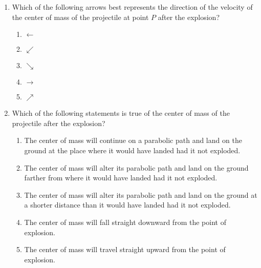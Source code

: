 \documentclass{../../oss-apphys}
\begin{document}
\begin{multicols}{2}
  \begin{enumerate}[leftmargin=18pt,resume]
  \item Which of the following arrows best represents the direction of the
    velocity of the center of mass of the projectile at point $P$ after the
    explosion?
    \begin{enumerate}[noitemsep,topsep=0pt,leftmargin=18pt,label=(\Alph*)]
    \item $\leftarrow$
    \item $\swarrow$
    \item $\searrow$
    \item $\rightarrow$
    \item $\nearrow$
    \end{enumerate}

  \item Which of the following statements is true of the center of mass of the
    projectile after the explosion?
    \begin{enumerate}[noitemsep,topsep=0pt,leftmargin=18pt,label=(\Alph*)]
    \item The center of mass will continue on a parabolic path and land on
      the ground at the place where it would have landed had it not exploded.
    \item The center of mass will alter its parabolic path and land on the
      ground farther from where it would have landed had it not exploded.
    \item The center of mass will alter its parabolic path and land on the
      ground at a shorter distance than it would have landed had it not
      exploded.
    \item The center of mass will fall straight downward from the point of
      explosion.
    \item The center of mass will travel straight upward from the point of
      explosion.
    \end{enumerate}
    
    \columnbreak
    

\end{enumerate}
\end{multicols}
\end{document}
